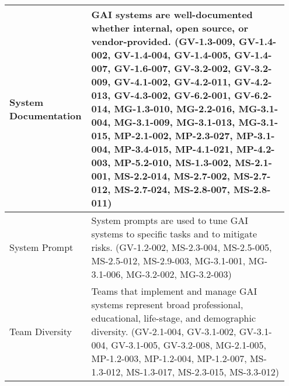 \documentclass[fleqn]{article}
\begin{document}
\begin{table}[H]
\begin{tabular}{|m{0.25\linewidth} |m{0.70\linewidth} |}
		\hline
		System Documentation & GAI systems are well-documented whether internal, open source, or vendor-provided. (GV-1.3-009, GV-1.4-002, GV-1.4-004, GV-1.4-005, GV-1.4-007, GV-1.6-007, GV-3.2-002, GV-3.2-009, GV-4.1-002, GV-4.2-011, GV-4.2-013, GV-4.3-002, GV-6.2-001, GV-6.2-014, MG-1.3-010, MG-2.2-016, MG-3.1-004, MG-3.1-009, MG-3.1-013, MG-3.1-015, MP-2.1-002, MP-2.3-027, MP-3.1-004, MP-3.4-015, MP-4.1-021, MP-4.2-003, MP-5.2-010, MS-1.3-002, MS-2.1-001, MS-2.2-014, MS-2.7-002, MS-2.7-012, MS-2.7-024, MS-2.8-007, MS-2.8-011) \\ 
		\hline
		System Prompt & System prompts are used to tune GAI systems to specific tasks and to mitigate risks. (GV-1.2-002, MS-2.3-004, MS-2.5-005, MS-2.5-012, MS-2.9-003, MG-3.1-001, MG-3.1-006, MG-3.2-002, MG-3.2-003) \\ 
		\hline
		Team Diversity & Teams that implement and manage GAI systems represent broad professional, educational, life-stage, and demographic diversity. (GV-2.1-004, GV-3.1-002, GV-3.1-004, GV-3.1-005, GV-3.2-008, MG-2.1-005, MP-1.2-003, MP-1.2-004, MP-1.2-007, MS-1.3-012, MS-1.3-017, MS-2.3-015, MS-3.3-012) \\ 
		\hline	
	\end{tabular}
\end{table}
\pagebreak
\end{document}
